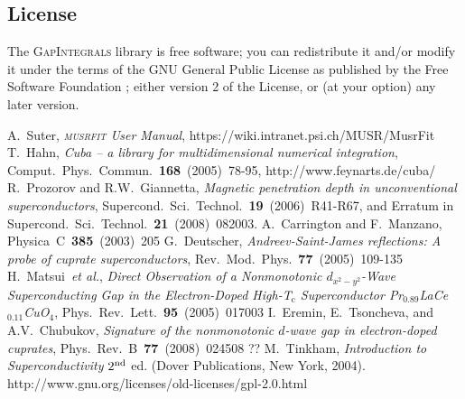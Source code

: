 \documentclass[twoside]{article}
\newcommand{\musrfit}{\textsc{musrfit}\xspace}
\newcommand{\gapint}{\textsc{GapIntegrals}\xspace}
\begin{document}
\subsection*{License}
The \gapint library is free software; you can redistribute it and/or modify it under the terms of the GNU General Public License as published by the Free Software Foundation \cite{GPL}; either version 2 of the License, or (at your option) any later version.


\begin{thebibliography}{1}

 A.~Suter, \textit{\musrfit User Manual}, https://wiki.intranet.psi.ch/MUSR/MusrFit
 T.~Hahn, \textit{Cuba -- a library for multidimensional numerical integration}, Comput.~Phys.~Commun.~\textbf{168}~(2005)~78-95, http://www.feynarts.de/cuba/
 R.~Prozorov and R.W.~Giannetta, \textit{Magnetic penetration depth in unconventional superconductors}, Supercond.\ Sci.\ Technol.\ \textbf{19}~(2006)~R41-R67, and Erratum in Supercond.\ Sci.\ Technol.\ \textbf{21}~(2008)~082003.
 A.~Carrington and F.~Manzano, Physica~C~\textbf{385}~(2003)~205
 G.~Deutscher, \textit{Andreev-Saint-James reflections: A probe of cuprate superconductors}, Rev.~Mod.~Phys.~\textbf{77}~(2005)~109-135
 H.~Matsui~\textit{et al.}, \textit{Direct Observation of a Nonmonotonic $d_{x^2-y^2}$-Wave Superconducting Gap in the Electron-Doped High-T$_{\mathrm c}$ Superconductor Pr$_{0.89}$LaCe$_{0.11}$CuO$_4$}, Phys.~Rev.~Lett.~\textbf{95}~(2005)~017003
 I.~Eremin, E.~Tsoncheva, and A.V.~Chubukov, \textit{Signature of the nonmonotonic $d$-wave gap in electron-doped cuprates}, Phys.~Rev.~B~\textbf{77}~(2008)~024508
 ??
 M.~Tinkham, \textit{Introduction to Superconductivity} $2^{\rm nd}$ ed. (Dover Publications, New York, 2004).
 http://www.gnu.org/licenses/old-licenses/gpl-2.0.html

\end{thebibliography}
\end{document}
